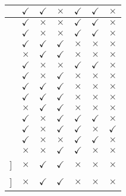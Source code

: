 \begin{table}[h]
\begin{tabular}{|c|c|c|c|c|c|c|}
 \hline
[Ahma11] & $\checkmark$  &  $\checkmark$ &  $\times$ & $\checkmark$ & $\checkmark$ & $\times$\\
 \hline
[Deb12] &  $\checkmark$ &  $\times$ &  $\times$ & $\checkmark$ & $\checkmark$ & $\times$\\
 \hline
[Basu11] &  $\checkmark$ &  $\times$ &  $\times$ & $\checkmark$ & $\checkmark$ & $\times$\\
 \hline
[Berr11] &  $\checkmark$ &  $\checkmark$ &  $\checkmark$ & $\times$ & $\times$ & $\times$\\
 \hline
[Habb11] &  $\times$ &  $\checkmark$ &  $\checkmark$ & $\times$ & $\times$ & $\times$\\
 \hline
[Mazu07] &  $\checkmark$ &  $\times$ &  $\times$ & $\checkmark$ & $\checkmark$ & $\times$\\
 \hline
[Moon11] &  $\checkmark$ &  $\times$ &  $\checkmark$ & $\times$ & $\times$ & $\times$\\
 \hline
[Liu13] &  $\checkmark$ &  $\checkmark$ &  $\checkmark$ & $\times$ & $\times$ & $\times$\\
 \hline
[Bare05] &  $\checkmark$ &  $\checkmark$ &  $\checkmark$ & $\times$ & $\times$ & $\times$\\
 \hline
[Mast05] &  $\times$ &  $\checkmark$ &  $\checkmark$ & $\times$ & $\times$ & $\times$\\
 \hline
[Rash11] &  $\checkmark$ &  $\times$ &  $\checkmark$ & $\checkmark$ & $\checkmark$ & $\times$\\
 \hline
[Sure11] &  $\checkmark$ &  $\times$ &  $\checkmark$ & $\checkmark$ & $\times$ & $\checkmark$\\
 \hline
[Sayy11] &  $\checkmark$ &  $\times$ &  $\times$ & $\checkmark$ & $\checkmark$ & $\times$\\
 \hline
[Saez07] &  $\times$ &  $\times$ &  $\checkmark$ & $\checkmark$ & $\times$ & $\times$\\
 \hline
[[Kwun07] ] &  $\times$ &  $\checkmark$ &  $\checkmark$ & $\times$ & $\times$ & $\times$\\
 \hline
[[Tami09] ] &  $\times$ &  $\checkmark$ &  $\checkmark$ & $\times$ & $\times$ & $\times$\\
 \hline
 \end{tabular}
\vspace{-0.3cm}

\end{table}


